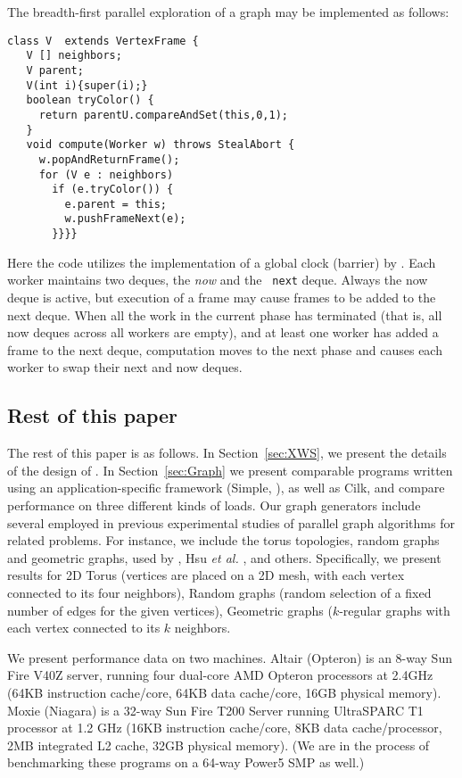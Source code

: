\begin{example}[BFS] \label{example:bfs}
The breadth-first parallel exploration of a graph may be implemented
as follows:
{\footnotesize
\begin{verbatim}
class V  extends VertexFrame {
   V [] neighbors;
   V parent;
   V(int i){super(i);}
   boolean tryColor() {
     return parentU.compareAndSet(this,0,1);
   }
   void compute(Worker w) throws StealAbort {
     w.popAndReturnFrame();
     for (V e : neighbors) 
       if (e.tryColor()) {
         e.parent = this;
         w.pushFrameNext(e);
       }}}}
\end{verbatim}}

Here the code utilizes the implementation of a global clock (barrier)
by \XWS. Each worker maintains two deques, the {\em now} and the {\tt
next} deque. Always the now deque is active, but execution of a frame
may cause frames to be added to the next deque.  When all the work in
the current phase has terminated (that is, all now deques across all
workers are empty), and at least one worker has added a frame to the
next deque, computation moves to the next phase and causes each worker
to swap their next and now deques.
\end{example}

\subsection{Rest of this paper}

The rest of this paper is as follows. In Section~\ref{sec:XWS}, we
present the details of the design of \XWS. In Section~\ref{sec:Graph}
we present comparable programs written using an application-specific
framework (Simple, \cite{BC04a}), as well as Cilk, and compare
performance on three different kinds of loads.  Our graph generators
include several employed in previous experimental studies of parallel
graph algorithms for related problems. For instance, we include the
torus topologies, random graphs and geometric graphs, used 
by \cite{Gre94}, Hsu \emph{et al.}  \cite{HRD97}, and others.
Specifically, we present results for 2D Torus (vertices are placed on a 2D mesh, with each vertex connected to its four neighbors), Random graphs (random selection of a fixed number of edges for the given vertices), Geometric graphs ($k$-regular graphs with each vertex connected to its $k$ neighbors.



We present performance data on two machines. Altair (Opteron) is an
8-way Sun Fire V40Z server, running four dual-core AMD Opteron
processors at 2.4GHz (64KB instruction cache/core, 64KB data
cache/core, 16GB physical memory). Moxie (Niagara) is a 32-way Sun
Fire T200 Server running UltraSPARC T1 processor at 1.2 GHz (16KB
instruction cache/core, 8KB data cache/processor, 2MB integrated L2
cache, 32GB physical memory). (We are in the process of benchmarking
these programs on a 64-way Power5 SMP as well.)

